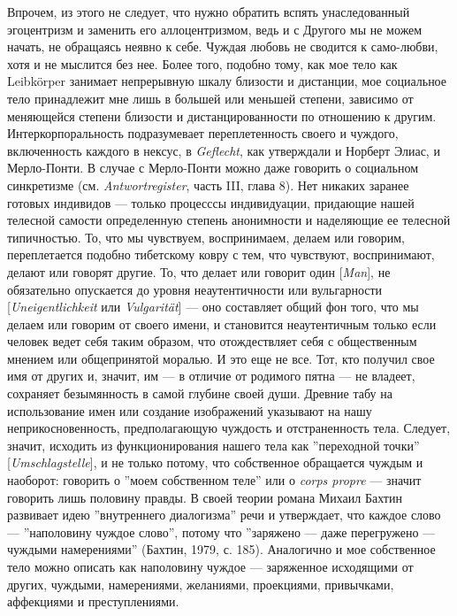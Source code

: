 \documentclass[12pt]{book}
\begin{document}
Впрочем, из этого не следует, что нужно обратить вспять унаследованный эгоцентризм и заменить его аллоцентризмом, ведь и с Другого мы не можем начать, не обращаясь неявно к себе. Чуждая любовь не сводится к само-любви, хотя и не мыслится без нее. Более того, подобно тому, как мое тело как Leibkörper занимает непрерывную шкалу близости и дистанции, мое социальное тело принадлежит мне лишь в большей или меньшей степени, зависимо от меняющейся степени близости и дистанцированности по отношению к другим. Интеркорпоральность подразумевает переплетенность своего и чуждого, включенность каждого в нексус, в \textit{Geflecht}, как утверждали и Норберт Элиас, и Мерло-Понти. В случае с Мерло-Понти можно даже говорить о социальном синкретизме (см. \textit{Antwortregister}, часть III, глава 8). Нет никаких заранее готовых индивидов --- только процесссы индивидуации, придающие нашей телесной самости определенную степень анонимности и наделяющие ее телесной типичностью. То, что мы чувствуем, воспринимаем, делаем или говорим, переплетается подобно тибетскому ковру с тем, что чувствуют, воспринимают, делают или говорят другие. То, что делает или говорит один [\textit{Man}], не обязательно опускается до уровня неаутентичности или вульгарности [\textit{Uneigentlichkeit} или \textit{Vulgarität}] --- оно составляет общий фон того, что мы делаем или говорим от своего имени, и становится неаутентичным только если человек ведет себя таким образом, что отождествляет себя с общественным мнением или общепринятой моралью. И это еще не все. Тот, кто получил свое имя от других и, значит, им --- в отличие от родимого пятна --- не владеет, сохраняет безымянность в самой глубине своей души. Древние табу на использование имен или создание изображений указывают на нашу неприкосновенность, предполагающую чуждость и отстраненность тела. Следует, значит, исходить из функционирования нашего тела как ''переходной точки'' [\textit{Umschlagstelle}], и не только потому, что собственное обращается чуждым и наоборот: говорить о ''моем собственном теле'' или о \textit{corps propre} --- значит говорить лишь половину правды. В своей теории романа Михаил Бахтин развивает идею ''внутреннего диалогизма'' речи и утверждает, что каждое слово --- ''наполовину чуждое слово'', потому что ''заряжено --- даже перегружено --- чуждыми намерениями'' (Бахтин, 1979, с. 185). Аналогично и мое собственное тело можно описать как наполовину чуждое --- заряженное исходящими от других, чуждыми, намерениями, желаниями, проекциями, привычками, аффекциями и преступлениями.
\end{document}
